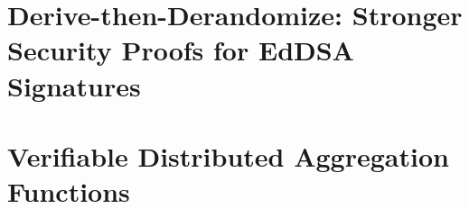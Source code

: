 \documentclass[11pt]{ucsddissertation}
\begin{document}
\chapter{Derive-then-Derandomize: Stronger Security Proofs for EdDSA Signatures}\label{chap:eddsa}






%
\chapter{Verifiable Distributed Aggregation Functions}\label{chap:vdaf}


%
%
\end{document}
